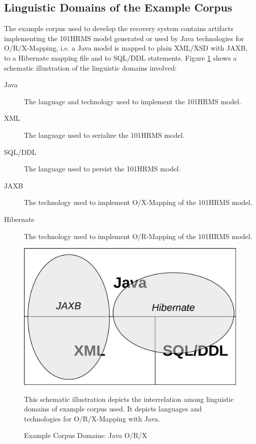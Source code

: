 \subsection{Linguistic Domains of the Example Corpus}
The example corpus used to develop the recovery system contains artifacts implementing the \acrshort{101HRMS} model generated or used by \Gls{Java} technologies for \acrfull{O/R/X-Mapping}, i.e. a \Gls{Java} model is mapped to plain \acrshort{XML}/\acrshort{XSD} with \acrshort{JAXB}, to a \Gls{Hibernate} mapping file and to \acrshort{SQL}/\acrshort{DDL} statements.
Figure \ref{figure:ExampleCorpusJORXDomains} shows a schematic illustration of the linguistic domains involved:
\begin{description}

\item[Java]
The language and technology used to implement the \acrshort{101HRMS} model.

\item[XML]
The language used to serialize the \acrshort{101HRMS} model.

\item[SQL/DDL]
The language used to persist the \acrshort{101HRMS} model.

\item[JAXB]
The technology used to implement \acrfull{O/X-Mapping} of the \acrshort{101HRMS} model.

\item[Hibernate]
The technology used to implement \acrfull{O/R-Mapping} of the \acrshort{101HRMS} model.

\end{description}

\begin{figure}[h!]
\begin{center}
\includegraphics[scale=.4]{images/JORXDomains.png}
\end{center}
{
\scriptsize 
This schematic illustration depicts the interrelation among linguistic domains of example corpus used.
It depicts languages and technologies for \acrfull{O/R/X-Mapping} with \Gls{Java}.
}
\caption{Example Corpus Domains: Java O/R/X}
\label{figure:ExampleCorpusJORXDomains}
\end{figure}

